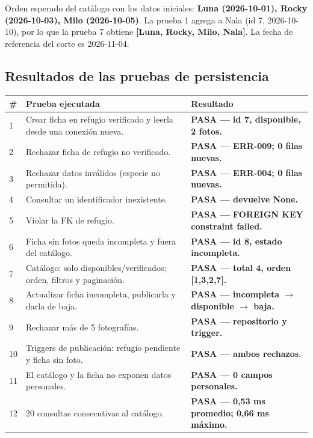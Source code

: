 \documentclass[11pt,a4paper]{article}
\newcommand{\thead}[1]{\textbf{#1}}
\begin{document}
{\footnotesize
Orden esperado del catálogo con los datos iniciales: \textbf{Luna (2026-10-01), Rocky (2026-10-03),
Milo (2026-10-05)}. La prueba 1 agrega a Nala (id 7, 2026-10-10), por lo que la prueba 7 obtiene
\textbf{[Luna, Rocky, Milo, Nala]}. La fecha de referencia del corte es 2026-11-04.\par}

\subsection{Resultados de las pruebas de persistencia}

{\footnotesize
\begin{tabularx}{\linewidth}{@{}Z{0.18}V{1.62}V{1.2}@{}}
\toprule

\thead{\#} & \thead{Prueba ejecutada} & \thead{Resultado} \\ \midrule

1 & Crear ficha en refugio verificado y leerla desde una conexión nueva. & \textbf{PASA --- id 7, disponible, 2 fotos.} \\
2 & Rechazar ficha de refugio no verificado. & \textbf{PASA --- ERR-009; 0 filas nuevas.} \\
3 & Rechazar datos inválidos (especie no permitida). & \textbf{PASA --- ERR-004; 0 filas nuevas.} \\
4 & Consultar un identificador inexistente. & \textbf{PASA --- devuelve None.} \\
5 & Violar la FK de refugio. & \textbf{PASA --- FOREIGN KEY constraint failed.} \\
6 & Ficha sin fotos queda incompleta y fuera del catálogo. & \textbf{PASA --- id 8, estado incompleta.} \\
7 & Catálogo: solo disponibles/verificados; orden, filtros y paginación. & \textbf{PASA --- total 4, orden [1,3,2,7].} \\
8 & Actualizar ficha incompleta, publicarla y darla de baja. & \textbf{PASA --- incompleta $\rightarrow$ disponible $\rightarrow$ baja.} \\
9 & Rechazar más de 5 fotografías. & \textbf{PASA --- repositorio y trigger.} \\
10 & Triggers de publicación: refugio pendiente y ficha sin foto. & \textbf{PASA --- ambos rechazos.} \\
11 & El catálogo y la ficha no exponen datos personales. & \textbf{PASA --- 0 campos personales.} \\
12 & 20 consultas consecutivas al catálogo. & \textbf{PASA --- 0,53 ms promedio; 0,66 ms máximo.} \\
\bottomrule
\end{tabularx}
}
\end{document}
